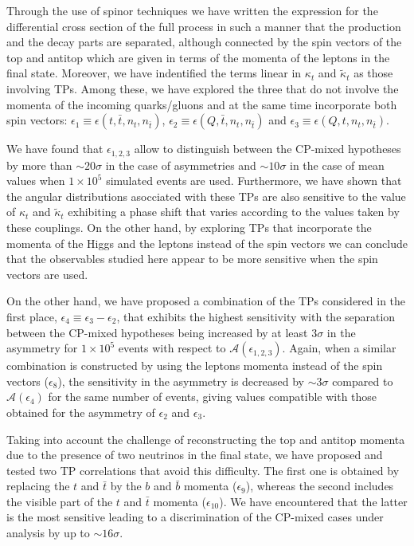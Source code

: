 \documentclass[aps,preprint,tightenlines,floatfix,superscriptaddress,nofootinbib,showpacs]{revtex4-1}
\def\tbar{\bar{t}}
\def\bbar{\bar{b}}
\def\kp{\kappa_t}
\def\kpt{\tilde{\kappa}_t}
\def\TPa{\epsilon(t,\tbar,n_t,n_{\tbar})}
\def\TPb{\epsilon(Q,\tbar,n_t,n_{\tbar})}
\def\TPc{\epsilon(Q,t,n_t,n_{\tbar})}
\providecommand{\DIFaddbegin}{} %
\providecommand{\DIFaddend}{} %
\begin{document}
Through the use of spinor techniques we have written the expression
for the differential cross section of the full process in such a
manner that the production and the decay parts are separated, although
connected by the spin vectors of the top and antitop which are given
in terms of the momenta of the leptons in the final state. Moreover,
we have indentified the terms linear in $\kp$ and $\kpt$ as those
involving TPs. Among these, we have explored the three that do not
involve the momenta of the incoming quarks/gluons and at the same time
incorporate both spin vectors: $\epsilon_1\equiv \TPa$,
$\epsilon_2\equiv \TPb$ and $\epsilon_3\equiv \TPc$.\par
\DIFaddbegin 

\DIFaddend We have found
that $\epsilon_{1,2,3}$ allow to distinguish between the
$\mathrm{CP}$-mixed hypotheses by more than $\sim 20\sigma$ in the
case of asymmetries and $\sim 10\sigma$ in the case of mean values
when $1 \times 10^5$ simulated events are used. Furthermore, we have
shown that the angular distributions asocciated with these TPs are
also sensitive to the value of $\kp$ and $\kpt$ exhibiting a phase
shift that varies according to the values taken by these couplings. On
the other hand, by exploring TPs that incorporate the momenta of the
Higgs and the leptons instead of the spin vectors we can conclude that
the observables studied here appear to be more sensitive when the spin
vectors are used.\par

On the other hand, we have proposed a combination of the TPs
considered in the first place, $\epsilon_4\equiv
\epsilon_3-\epsilon_2$, that exhibits the highest sensitivity with the
separation between the $\mathrm{CP}$-mixed hypotheses being increased
by at least $3\sigma$ in the asymmetry for $1 \times 10^5$ events with
respect to $\mathcal{A}(\epsilon_{1,2,3})$. Again, when a similar
combination is constructed by using the leptons momenta instead of the
spin vectors ($\epsilon_8$), the sensitivity in the asymmetry is
decreased by $\sim 3\sigma$ compared to $\mathcal{A}(\epsilon_4)$ for
the same number of events, giving values compatible with those
obtained for the asymmetry of $\epsilon_2$ and $\epsilon_3$. \par

Taking into account the challenge of reconstructing the top and
antitop momenta due to the presence of two neutrinos in the final
state, we have proposed and tested two TP correlations that avoid this
difficulty. The first one is obtained by replacing the $t$ and $\tbar$
by the $b$ and $\bbar$ momenta ($\epsilon_9$), whereas the second
includes the visible part of the $t$ and $\tbar$ momenta
($\epsilon_{10}$). We have encountered that the latter is the most
sensitive leading to a discrimination of the $\mathrm{CP}$-mixed cases
under analysis by up to $\sim 16\sigma$.\par
\end{document}
